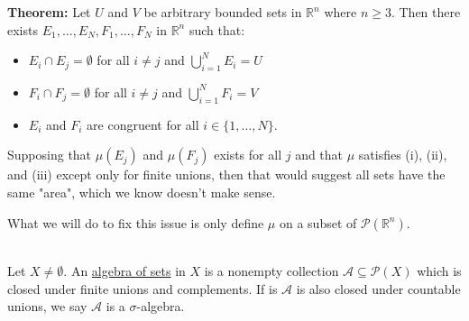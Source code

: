 \documentclass{book}
\newcommand{\hTwo}{%
\color{MidnightBlue}%
   \fontsize{13}{15}\selectfont%
}
\newenvironment{myIndent}{%
   \begin{adjustwidth}{2.5em}{0em}%
}{%
   \end{adjustwidth}%
}
\newcommand{\udefine}[1]{{%
   \setulcolor{Red}%
   \setul{0.14em}{0.07em}%
   \ul{#1}%
}}
\newcommand{\blab}[1]{\textbf{#1}}
\newcommand{\mySepTwo}[1][.]{%
   {\noindent\color{#1}{\rule{6.5in}{0.5mm}}}\\%
}
\newcommand{\retTwo}{\hfill\bigbreak}
\begin{document}
\begin{myIndent}
   \hTwo
   \blab{Theorem:} Let $U$ and $V$ be arbitrary bounded sets in $\mathbb{R}^n$ where $n \geq 3$. Then there exists $E_1,\ldots, E_N, F_1, \ldots, F_N$ in $\mathbb{R}^n$ such that:
   \begin{itemize}
      \item $E_i \cap E_j = \emptyset$ for all $i \neq j$ and $\bigcup\limits_{i = 1}^NE_i = U$
      \item $F_i \cap F_j = \emptyset$ for all $i \neq j$ and $\bigcup\limits_{i = 1}^NF_i = V$
      \item $E_i$ and $F_i$ are congruent for all $i \in \{1, \ldots, N\}$.\retTwo
   \end{itemize}

   Supposing that $\mu(E_j)$ and $\mu(F_j)$ exists for all $j$ and that $\mu$ satisfies (i), (ii), and (iii) except only for finite unions, then that would suggest all sets have the same "area", which we know doesn't make sense.
\end{myIndent}

What we will do to fix this issue is only define $\mu$ on a subset of $\mathcal{P}(\mathbb{R}^n)$.\retTwo

\mySepTwo 

Let $X \neq \emptyset$. An \udefine{algebra of sets} in $X$ is a nonempty collection $\mathcal{A} \subseteq \mathcal{P}(X)$ which is closed under finite unions and complements. If is $\mathcal{A}$ is also closed under countable unions, we say $\mathcal{A}$ is a $\sigma$-algebra.
\end{document}
